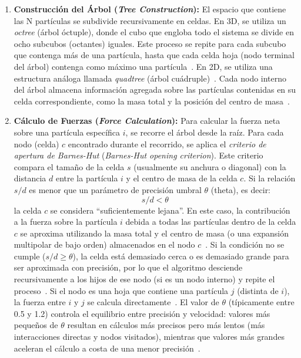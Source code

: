 \begin{enumerate}
    \item \textbf{Construcción del Árbol (\textit{Tree Construction}):} El espacio que contiene las N partículas se subdivide recursivamente en celdas. En 3D, se utiliza un \textit{octree} (árbol óctuple), donde el cubo que engloba todo el sistema se divide en ocho subcubos (octantes) iguales. Este proceso se repite para cada subcubo que contenga más de una partícula, hasta que cada celda hoja (nodo terminal del árbol) contenga como máximo una partícula~\cite{Barnes1986, dubinski1996}. En 2D, se utiliza una estructura análoga llamada \textit{quadtree} (árbol cuádruple)~\cite{aguirre2020, munier2020}. Cada nodo interno del árbol almacena información agregada sobre las partículas contenidas en su celda correspondiente, como la masa total y la posición del centro de masa~\cite{Barnes1986, salmon1991}.

    \item \textbf{Cálculo de Fuerzas (\textit{Force Calculation}):} Para calcular la fuerza neta sobre una partícula específica $i$, se recorre el árbol desde la raíz. Para cada nodo (celda) $c$ encontrado durante el recorrido, se aplica el \textit{criterio de apertura de Barnes-Hut} (\textit{Barnes-Hut opening criterion}). Este criterio compara el tamaño de la celda $s$ (usualmente su anchura o diagonal) con la distancia $d$ entre la partícula $i$ y el centro de masa de la celda $c$. Si la relación $s/d$ es menor que un parámetro de precisión umbral $\theta$ (theta), es decir:
    \[ s / d < \theta \]
    la celda $c$ se considera ``suficientemente lejana''. En este caso, la contribución a la fuerza sobre la partícula $i$ debida a todas las partículas dentro de la celda $c$ se aproxima utilizando la masa total y el centro de masa (o una expansión multipolar de bajo orden) almacenados en el nodo $c$~\cite{Barnes1986, salmon1991, barnes1990}. Si la condición no se cumple ($s/d \ge \theta$), la celda está demasiado cerca o es demasiado grande para ser aproximada con precisión, por lo que el algoritmo desciende recursivamente a los hijos de ese nodo (si es un nodo interno) y repite el proceso~\cite{Barnes1986, barnes1990}. Si el nodo es una hoja que contiene una partícula $j$ (distinta de $i$), la fuerza entre $i$ y $j$ se calcula directamente~\cite{pfalzner1996}. El valor de $\theta$ (típicamente entre 0.5 y 1.2) controla el equilibrio entre precisión y velocidad: valores más pequeños de $\theta$ resultan en cálculos más precisos pero más lentos (más interacciones directas y nodos visitados), mientras que valores más grandes aceleran el cálculo a costa de una menor precisión~\cite{barnes1990, aguirre2020}.
\end{enumerate}

